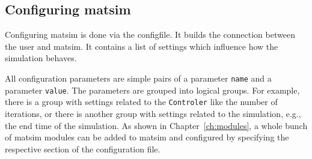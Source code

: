 \subsection{Configuring \protect\gls{matsim}}
\label{sec:lgs-config}
Configuring \gls{matsim} is 
done via the \gls{configfile}. It builds the connection between the user and \gls{matsim}. It contains a list of settings which influence how the simulation behaves.
%
%

All configuration parameters are simple pairs of a \gls{parameter} \lstinline|name| and a \gls{parameter} \lstinline|value|. The \glspl{parameter} are grouped into logical groups. For example, there is a group with settings related to the \lstinline|Controler| like the number of \glspl{iteration}, or there is another group with settings related to the \gls{simulation}, e.g.,\,the end time of the simulation. As shown in Chapter~\ref{ch:modules}, a whole bunch of \gls{matsim} modules can be added to \gls{matsim} and configured by specifying the respective section of the configuration file.

